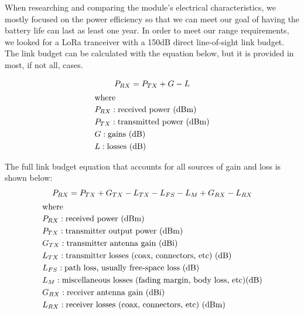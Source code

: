 When researching and comparing the module's electrical characteristics, we
mostly focused on the power efficiency so that we can meet our goal of having
the battery life can last as least one year. In order to meet our range
requirements, we looked for a LoRa tranceiver with a 150dB direct line-of-sight
link budget. The link budget can be calculated with the equation below, but it
is provided in most, if not all, cases. 

\begin{gather}\label{eq-link-budget}
P_{RX} = P_{TX} + G - L \\
\intertext{where}
\begin{aligned}
& P_{RX}: \text{received power (dBm)} \\
& P_{TX}: \text{transmitted power (dBm)} \\
& G: \text{gains (dB)} \\
& L: \text{losses (dB)} \\
\end{aligned}\notag
\end{gather}

The full link budget equation that accounts for all sources of gain and loss is
shown below:
\begin{gather}\label{eq-link-budget-full}
P_{RX} = P_{TX} + G_{TX} - L_{TX} - L_{FS} - L_M + G_{RX} - L_{RX} \\
\intertext{where}
\begin{aligned}
& P_{RX}: \text{received power (dBm)} \\
& P_{TX}: \text{transmitter output power (dBm)} \\
& G_{TX}: \text{transmitter antenna gain (dBi)} \\
& L_{TX}: \text{transmitter losses (coax, connectors, etc) (dB)} \\
& L_{FS}: \text{path loss, usually free-space loss (dB)} \\
& L_{M}: \text{miscellaneous losses (fading margin, body loss, etc)(dB)} \\
& G_{RX}: \text{receiver antenna gain (dBi)} \\
& L_{RX}: \text{receiver losses (coax, connectors, etc) (dBm)} \\
\end{aligned}\notag
\end{gather}

